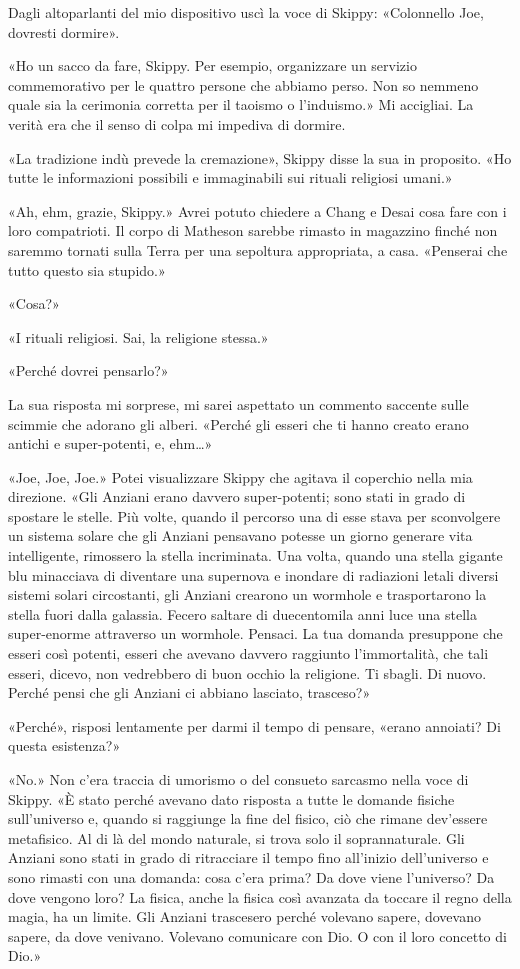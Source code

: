 Dagli altoparlanti del mio dispositivo uscì la voce di Skippy:
«Colonnello Joe, dovresti dormire».

«Ho un sacco da fare, Skippy. Per esempio, organizzare un servizio
commemorativo per le quattro persone che abbiamo perso. Non so nemmeno
quale sia la cerimonia corretta per il taoismo o l'induismo.» Mi
accigliai. La verità era che il senso di colpa mi impediva di dormire.

«La tradizione indù prevede la cremazione», Skippy disse la sua in
proposito. «Ho tutte le informazioni possibili e immaginabili sui
rituali religiosi umani.»

«Ah, ehm, grazie, Skippy.» Avrei potuto chiedere a Chang e Desai cosa
fare con i loro compatrioti. Il corpo di Matheson sarebbe rimasto in
magazzino finché non saremmo tornati sulla Terra per una sepoltura
appropriata, a casa. «Penserai che tutto questo sia stupido.»

«Cosa?»

«I rituali religiosi. Sai, la religione stessa.»

«Perché dovrei pensarlo?»

La sua risposta mi sorprese, mi sarei aspettato un commento saccente
sulle scimmie che adorano gli alberi. «Perché gli esseri che ti hanno
creato erano antichi e super-potenti, e, ehm\ldots»

«Joe, Joe, Joe.» Potei visualizzare Skippy che agitava il coperchio
nella mia direzione. «Gli Anziani erano davvero super-potenti; sono
stati in grado di spostare le stelle. Più volte, quando il percorso una
di esse stava per sconvolgere un sistema solare che gli Anziani
pensavano potesse un giorno generare vita intelligente, rimossero la
stella incriminata. Una volta, quando una stella gigante blu minacciava
di diventare una supernova e inondare di radiazioni letali diversi
sistemi solari circostanti, gli Anziani crearono un wormhole e
trasportarono la stella fuori dalla galassia. Fecero saltare di
duecentomila anni luce una stella super-enorme attraverso un wormhole.
Pensaci. La tua domanda presuppone che esseri così potenti, esseri che
avevano davvero raggiunto l'immortalità, che tali esseri, dicevo, non
vedrebbero di buon occhio la religione. Ti sbagli. Di nuovo. Perché
pensi che gli Anziani ci abbiano lasciato, trasceso?»

«Perché», risposi lentamente per darmi il tempo di pensare, «erano
annoiati? Di questa esistenza?»

«No.» Non c'era traccia di umorismo o del consueto sarcasmo nella voce
di Skippy. «È stato perché avevano dato risposta a tutte le domande
fisiche sull'universo e, quando si raggiunge la fine del fisico, ciò che
rimane dev'essere metafisico. Al di là del mondo naturale, si trova solo
il soprannaturale. Gli Anziani sono stati in grado di ritracciare il
tempo fino all'inizio dell'universo e sono rimasti con una domanda: cosa
c'era prima? Da dove viene l'universo? Da dove vengono loro? La fisica,
anche la fisica così avanzata da toccare il regno della magia, ha un
limite. Gli Anziani trascesero perché volevano sapere, dovevano sapere,
da dove venivano. Volevano comunicare con Dio. O con il loro concetto di
Dio.»

